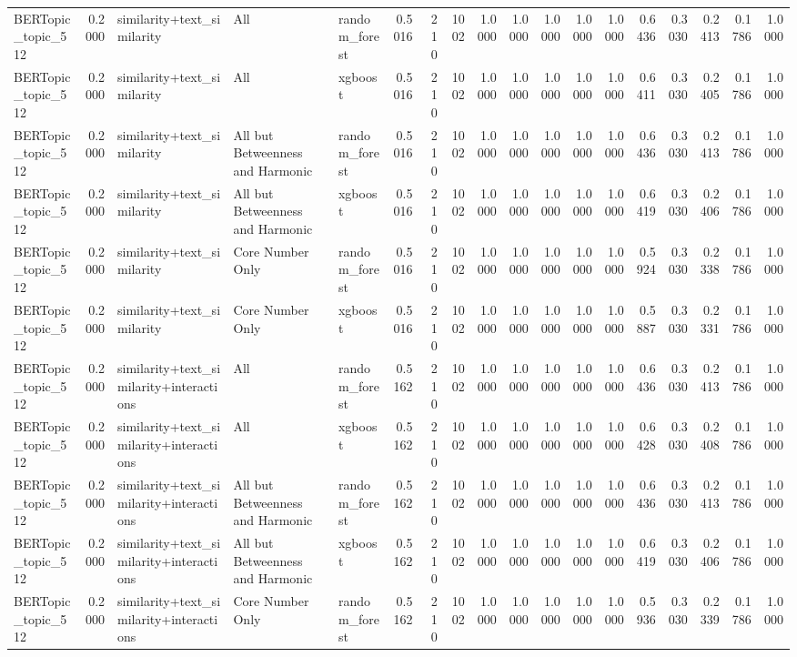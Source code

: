 \begin{tabular}{lrlllrrrrrrrrrrrrr}
BERTopic_topic_512 & 0.2000 & similarity+text_similarity & All & random_forest & 0.5016 & 210 & 1002 & 1.0000 & 1.0000 & 1.0000 & 1.0000 & 1.0000 & 0.6436 & 0.3030 & 0.2413 & 0.1786 & 1.0000 \\
BERTopic_topic_512 & 0.2000 & similarity+text_similarity & All & xgboost & 0.5016 & 210 & 1002 & 1.0000 & 1.0000 & 1.0000 & 1.0000 & 1.0000 & 0.6411 & 0.3030 & 0.2405 & 0.1786 & 1.0000 \\
BERTopic_topic_512 & 0.2000 & similarity+text_similarity & All but Betweenness and Harmonic & random_forest & 0.5016 & 210 & 1002 & 1.0000 & 1.0000 & 1.0000 & 1.0000 & 1.0000 & 0.6436 & 0.3030 & 0.2413 & 0.1786 & 1.0000 \\
BERTopic_topic_512 & 0.2000 & similarity+text_similarity & All but Betweenness and Harmonic & xgboost & 0.5016 & 210 & 1002 & 1.0000 & 1.0000 & 1.0000 & 1.0000 & 1.0000 & 0.6419 & 0.3030 & 0.2406 & 0.1786 & 1.0000 \\
BERTopic_topic_512 & 0.2000 & similarity+text_similarity & Core Number Only & random_forest & 0.5016 & 210 & 1002 & 1.0000 & 1.0000 & 1.0000 & 1.0000 & 1.0000 & 0.5924 & 0.3030 & 0.2338 & 0.1786 & 1.0000 \\
BERTopic_topic_512 & 0.2000 & similarity+text_similarity & Core Number Only & xgboost & 0.5016 & 210 & 1002 & 1.0000 & 1.0000 & 1.0000 & 1.0000 & 1.0000 & 0.5887 & 0.3030 & 0.2331 & 0.1786 & 1.0000 \\
BERTopic_topic_512 & 0.2000 & similarity+text_similarity+interactions & All & random_forest & 0.5162 & 210 & 1002 & 1.0000 & 1.0000 & 1.0000 & 1.0000 & 1.0000 & 0.6436 & 0.3030 & 0.2413 & 0.1786 & 1.0000 \\
BERTopic_topic_512 & 0.2000 & similarity+text_similarity+interactions & All & xgboost & 0.5162 & 210 & 1002 & 1.0000 & 1.0000 & 1.0000 & 1.0000 & 1.0000 & 0.6428 & 0.3030 & 0.2408 & 0.1786 & 1.0000 \\
BERTopic_topic_512 & 0.2000 & similarity+text_similarity+interactions & All but Betweenness and Harmonic & random_forest & 0.5162 & 210 & 1002 & 1.0000 & 1.0000 & 1.0000 & 1.0000 & 1.0000 & 0.6436 & 0.3030 & 0.2413 & 0.1786 & 1.0000 \\
BERTopic_topic_512 & 0.2000 & similarity+text_similarity+interactions & All but Betweenness and Harmonic & xgboost & 0.5162 & 210 & 1002 & 1.0000 & 1.0000 & 1.0000 & 1.0000 & 1.0000 & 0.6419 & 0.3030 & 0.2406 & 0.1786 & 1.0000 \\
BERTopic_topic_512 & 0.2000 & similarity+text_similarity+interactions & Core Number Only & random_forest & 0.5162 & 210 & 1002 & 1.0000 & 1.0000 & 1.0000 & 1.0000 & 1.0000 & 0.5936 & 0.3030 & 0.2339 & 0.1786 & 1.0000 \\

\end{tabular}
